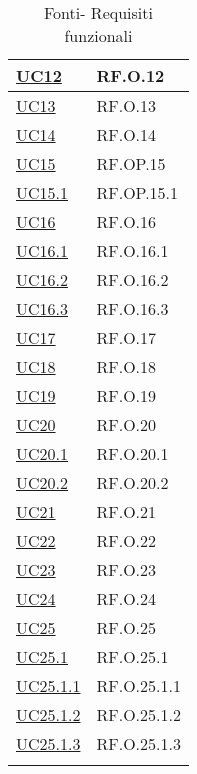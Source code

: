 \begin{longtable}{|P{4,5cm}|>{\arraybackslash}P{9cm}|}
  \hline
  \hyperref[UC12]{UC12} & RF.O.12 \\
  \hline
  \hyperref[UC13]{UC13} & RF.O.13 \\
  \hline
  \hyperref[UC14]{UC14} & RF.O.14 \\
  \hline
  \hyperref[UC15]{UC15} & RF.OP.15 \\
  \hline
  \hyperref[UC15point1]{UC15.1} & RF.OP.15.1 \\
  \hline
  \hyperref[UC16]{UC16} & RF.O.16 \\
  \hline
  \hyperref[UC16point1]{UC16.1} & RF.O.16.1 \\
  \hline
  \hyperref[UC16point2]{UC16.2} & RF.O.16.2 \\
  \hline
  \hyperref[UC16point3]{UC16.3} & RF.O.16.3 \\
  \hline
  \hyperref[UC17]{UC17} & RF.O.17 \\
  \hline
  \hyperref[UC18]{UC18} & RF.O.18 \\
  \hline
  \hyperref[UC19]{UC19} & RF.O.19 \\
  \hline
  \hyperref[UC20]{UC20} & RF.O.20 \\
  \hline
  \hyperref[UC20point1]{UC20.1} & RF.O.20.1 \\
  \hline
  \hyperref[UC20point2]{UC20.2} & RF.O.20.2 \\
  \hline
  \hyperref[UC21]{UC21} & RF.O.21 \\
  \hline
  \hyperref[UC22]{UC22} & RF.O.22 \\
  \hline
  \hyperref[UC23]{UC23} & RF.O.23 \\
  \hline
  \hyperref[UC24]{UC24} & RF.O.24 \\
  \hline
  \hyperref[UC25]{UC25} & RF.O.25 \\
  \hline
  \hyperref[UC25point1]{UC25.1} & RF.O.25.1 \\
  \hline
  \hyperref[UC25point1point1]{UC25.1.1} & RF.O.25.1.1 \\
  \hline
  \hyperref[UC25poin1point2]{UC25.1.2} & RF.O.25.1.2 \\
  \hline
  \hyperref[UC25poin1point3]{UC25.1.3} & RF.O.25.1.3 \\
  \hline
\caption{Fonti- Requisiti funzionali}
\end{longtable}
